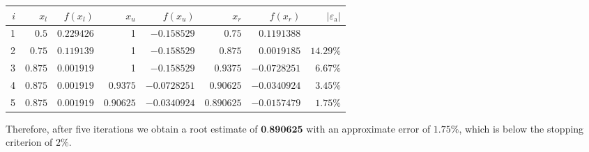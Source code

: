 \documentclass[../main.tex]{subfiles}
\begin{document}
\begin{enumerate}[label=\bfseries(\alph*)]
\begin{tabular}{|r|r|r|r|r|r|r|r|}
\hline
$i$ & $x_{l}$ & $f\left(x_{l}\right)$ & $x_{u}$ & $f\left(x_{u}\right)$ & $x_{r}$ & $f\left(x_{r}\right)$ & $\left|\varepsilon_{\mathrm{a}}\right|$ \\
\hline
1 & $0.5$ & $0.229426$ & 1 & $-0.158529$ & $0.75$ & $0.1191388$ &  \\
\hline
2 & $0.75$ & $0.119139$ & 1 & $-0.158529$ & $0.875$ & $0.0019185$ & $14.29 \%$ \\
\hline
3 & $0.875$ & $0.001919$ & 1 & $-0.158529$ & $0.9375$ & $-0.0728251$ & $6.67 \%$ \\
\hline
4 & $0.875$ & $0.001919$ & $0.9375$ & $-0.0728251$ & $0.90625$ & $-0.0340924$ & $3.45 \%$ \\
\hline
5 & $0.875$ & $0.001919$ & $0.90625$ & $-0.0340924$ & $0.890625$ & $-0.0157479$ & $1.75 \%$ \\
\hline
\end{tabular}
\bigbreak
Therefore, after five iterations we obtain a root estimate of $\mathbf{0 . 8 9 0 6 2 5}$ with an approximate error of $1.75 \%$, which is below the stopping criterion of $2 \%$.
\bigbreak
\end{enumerate}
\end{document}
